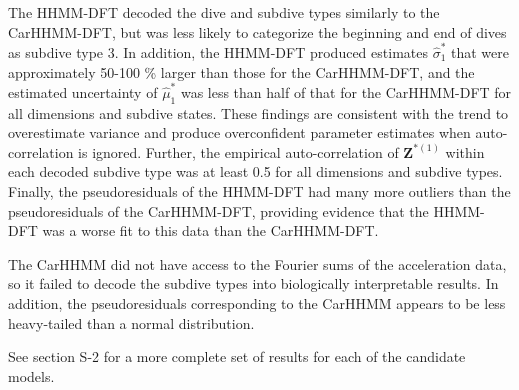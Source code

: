 The HHMM-DFT decoded the dive and subdive types similarly to the CarHHMM-DFT, but was less likely to categorize the beginning and end of dives as subdive type 3. In addition, the HHMM-DFT produced estimates $\hat \sigma_1^*$ that were approximately 50-100 \% larger than those for the CarHHMM-DFT, and the estimated uncertainty of $\hat \mu^*_1$ was less than half of that for the CarHHMM-DFT for all dimensions and subdive states. These findings are consistent with the trend to overestimate variance and produce overconfident parameter estimates when auto-correlation is ignored. Further, the empirical auto-correlation of $\mathbf{Z}^{*(1)}$ within each decoded subdive type was at least 0.5 for all dimensions and subdive types. Finally, the pseudoresiduals of the HHMM-DFT had many more outliers than the pseudoresiduals of the CarHHMM-DFT, providing evidence that the HHMM-DFT was a worse fit to this data than the CarHHMM-DFT.

The CarHHMM did not have access to the Fourier sums of the acceleration data, so it failed to decode the subdive types into biologically interpretable results. In addition, the pseudoresiduals corresponding to the CarHHMM appears to be less heavy-tailed than a normal distribution. 

See section S-2 for a more complete set of results for each of the candidate models.

